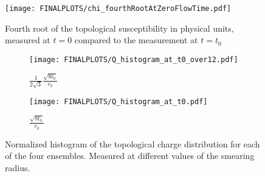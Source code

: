 \documentclass[a4paper,10pt]{book}
\begin{document}
\begin{figure}[htbp]
\centering
\texttt{[image: FINALPLOTS/chi\_fourthRootAtZeroFlowTime.pdf]}
\caption[Divergence at zero flow time of $\chi_t^{1/4}$]{Fourth root of the topological susceptibility in physical units, measured at $t=0$ compared to the measurement at $t=t_0$}\label{fig:ZeroFlowTime_chifourthroot}
\end{figure}

\begin{figure}[htbp]
\centering
\begin{subfigure}{0.5\textwidth}
\centering
\texttt{[image: FINALPLOTS/Q\_histogram\_at\_t0\_over12.pdf]}
\caption{$\frac{1}{2\sqrt{3}}\frac{\sqrt{8t_0}}{r_0}$}\label{fig:Qhistt0Over12}
\end{subfigure}%
\begin{subfigure}{0.5\textwidth}
\centering
\texttt{[image: FINALPLOTS/Q\_histogram\_at\_t0.pdf]}
\caption{$\frac{\sqrt{8t_0}}{r_0}$}\label{fig:Qhistt0}
\end{subfigure}
\caption[Topological charge distribution]{Normalized histogram of the topological charge distribution for each of the four ensembles. Measured at different values of the smearing radius.}
\end{figure}
\FloatBarrier
\end{document}
